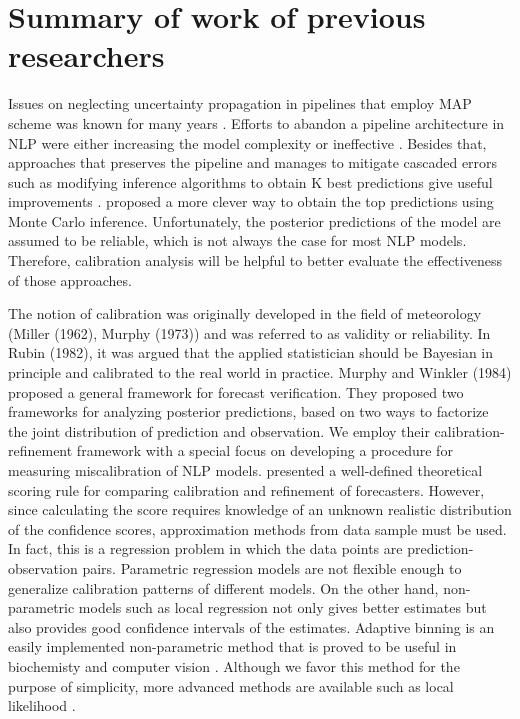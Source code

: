 \chapter{Summary of work of previous researchers}
\doublespacenormalsize

Issues on neglecting uncertainty propagation in pipelines that employ MAP scheme was known for many years \citep{draper1995assessment}. Efforts to abandon a pipeline architecture in NLP were either increasing the model complexity \citep{singh2013joint, DurrettKlein2014} or ineffective \citep{sutton2005joint}. Besides that, approaches that preserves the pipeline and manages to mitigate cascaded errors such as modifying inference algorithms to obtain K best predictions give useful improvements \citep{huang2005better, toutanova2005joint}. \cite{finkel2006solving} proposed a more clever way to obtain the top predictions using Monte Carlo inference. Unfortunately, the posterior predictions of the model are assumed to be reliable, which is not always the case for most NLP models. Therefore, calibration analysis will be helpful to better evaluate the effectiveness of those approaches.

The notion of calibration was originally developed in the field of meteorology (Miller (1962), Murphy (1973)) and was referred to as validity or reliability. In Rubin (1982), it was argued that the applied statistician should be Bayesian in principle and calibrated to the real world in practice. Murphy and Winkler (1984) proposed a general framework for forecast verification. They proposed two frameworks for analyzing posterior predictions, based on two ways to factorize the joint distribution of prediction and observation. We employ their calibration-refinement framework with a special focus on developing a procedure for measuring miscalibration of NLP models. \cite{degroot1983comparison} presented a well-defined theoretical scoring rule for comparing calibration and refinement of forecasters. However, since calculating the score requires knowledge of an unknown realistic distribution of the confidence scores, approximation methods from data sample must be used. In fact, this is a regression problem in which the data points are prediction-observation pairs. Parametric regression models are not flexible enough to generalize calibration patterns of different models. On the other hand, non-parametric models such as local regression \citep{wasserman2006all} not only gives better estimates but also provides good confidence intervals of the estimates. Adaptive binning is an easily implemented non-parametric method that is proved to be useful in biochemisty and computer vision \citep{davis2007adaptive, leow2004analysis}. Although we favor this method for the purpose of simplicity, more advanced methods are available such as local likelihood \citep{frolich2006non}.  

